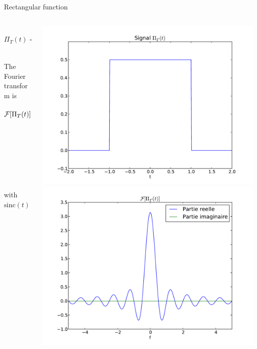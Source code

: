  \begin{exampleblock}{Rectangular function}
      \begin{columns}
          \begin{column}%
     \begin{equation}
      \label{eq:echelon}
      \Pi_T(t)=
      \begin{cases}
        1/T& \text{if } |t|< T/2\\
        1/2T& \text{if }  |t|= T/2\\
        0& \text{else}
      \end{cases}
    \end{equation}
    
      The Fourier transform is
      \begin{align*}
        \mathcal{F}[\Pi_T(t)]=&   \frac{1}{T}\int_{-T/2}^{T/2} e^{- i 2 \pi f t} d t \\
        =& \left[\frac{-e^{- i 2 \pi f t}}{i 2 \pi fT}\right]_{-T/2}^{T/2}\\
        =&  \frac{e^{i \pi f T}-e^{- i \pi f T}}{i 2 \pi fT}\\
        =& {\frac{\sin(\pi f T)}{\pi f T} = \text{sinc}(\pi f T)}
      \end{align*} 
    with 
    $\text{sinc}(t)= \frac{\sin(t)}{t}\quad\text{ and } \text{sinc}(0)=1$

          \end{column}
          \begin{column}%
            \begin{center}
            \includegraphics[width=.45\columnwidth]{imgs/fourier/sig_porte_ft.pdf}
            \includegraphics[width=.45\columnwidth]{imgs/fourier/ft_sig_porte_ft.pdf}
          \end{center}
         \end{column}
        \end{columns}
    
    
      \end{exampleblock}


